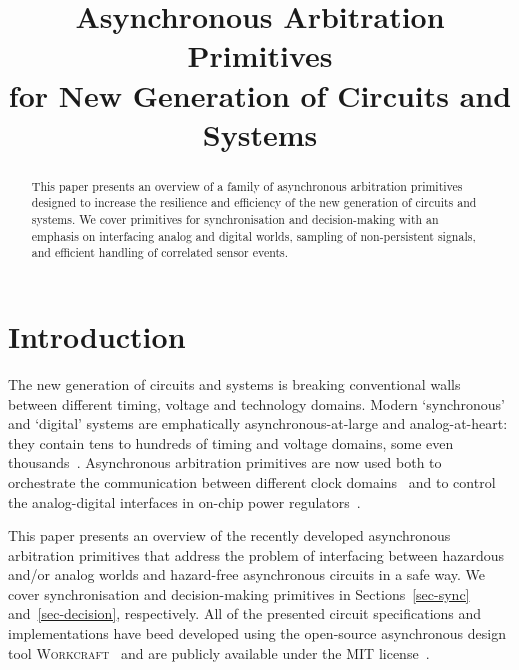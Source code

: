 \documentclass[conference]{IEEEtran}
\begin{document}
\title{Asynchronous Arbitration Primitives\\for New Generation of Circuits and Systems\vspace{-3mm}}
\author{
}

\maketitle

\begin{abstract}
This paper presents an overview of a family of asynchronous arbitration primitives designed
to increase the resilience and efficiency of the new generation of circuits and systems.
We cover primitives for synchronisation and decision-making with an emphasis on interfacing
analog and digital worlds, sampling of non-persistent signals, and efficient handling of
correlated sensor events.
\end{abstract}


\section{Introduction}

The new generation of circuits and systems is breaking conventional walls between
different timing, voltage and technology domains. Modern `synchronous' and `digital'
systems are emphatically asynchronous-at-large and analog-at-heart: they contain tens
to hundreds of timing and voltage domains, some even thousands~\cite{2017_bohnenstiehl_kilocore}.
Asynchronous arbitration primitives are now used both to orchestrate the communication
between different clock domains~\cite{2017_jiang_noc} and to control the analog-digital
interfaces in on-chip power regulators~\cite{2017_sokolov_a4a}.


This paper presents an overview of the recently developed asynchronous arbitration
primitives that address the problem of interfacing between hazardous and/or analog
worlds and hazard-free asynchronous circuits in a safe way. We cover synchronisation and
decision-making primitives in Sections~\ref{sec-sync} and~\ref{sec-decision}, respectively.
All of the presented circuit specifications and implementations have beed developed using
the open-source asynchronous design tool \textsc{Workcraft}~\cite{Workcraft_website} and are
publicly available under the MIT license~\cite{Arbitration_primitives_github}.
\end{document}
